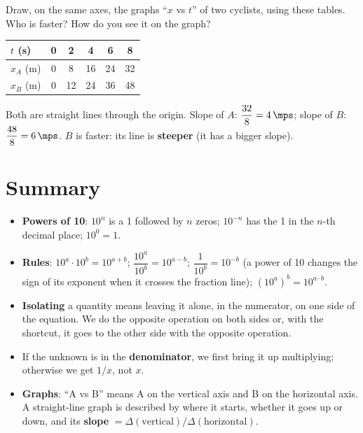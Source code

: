 \begin{exercise}
    Draw, on the same axes, the graphs ``\(x\) vs \(t\)'' of two cyclists, using these tables. Who is faster? How do you see it on the graph?
    \begin{center}
        \begin{tabular}{lccccc}
            \toprule
            \(t\) (s) & 0 & 2 & 4 & 6 & 8 \\
            \midrule
            \(x_A\) (m) & 0 & 8 & 16 & 24 & 32 \\
            \(x_B\) (m) & 0 & 12 & 24 & 36 & 48 \\
            \bottomrule
        \end{tabular}
    \end{center}
    \begin{solu}
        Both are straight lines through the origin. Slope of \(A\): \(\dfrac{32}{8} = \qty{4}{\mps}\); slope of \(B\): \(\dfrac{48}{8} = \qty{6}{\mps}\). \(B\) is faster: its line is \textbf{steeper} (it has a bigger slope).
    \end{solu}
\end{exercise}


\section*{Summary}

\begin{itemize}
    \item \textbf{Powers of 10}: \(10^{n}\) is a 1 followed by \(n\) zeros; \(10^{-n}\) has the 1 in the \(n\)-th decimal place; \(10^{0} = 1\).
    \item \textbf{Rules}: \(10^{a} \cdot 10^{b} = 10^{a+b}\); \(\dfrac{10^{a}}{10^{b}} = 10^{a-b}\); \(\dfrac{1}{10^{b}} = 10^{-b}\) (a power of 10 changes the sign of its exponent when it crosses the fraction line); \(\left(10^{a}\right)^{b} = 10^{a \cdot b}\).
    \item \textbf{Isolating} a quantity means leaving it alone, in the numerator, on one side of the equation. We do the opposite operation on both sides or, with the shortcut, it goes to the other side with the opposite operation.
    \item If the unknown is in the \textbf{denominator}, we first bring it up multiplying; otherwise we get \(1/x\), not \(x\).
    \item \textbf{Graphs}: ``A vs B'' means A on the vertical axis and B on the horizontal axis. A straight-line graph is described by where it starts, whether it goes up or down, and its \textbf{slope} \(= \Delta(\text{vertical}) / \Delta(\text{horizontal})\).
\end{itemize}
